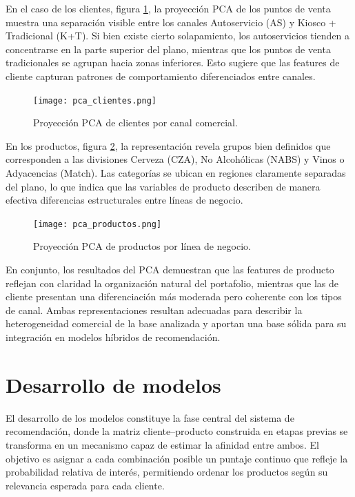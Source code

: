 En el caso de los clientes, figura \ref{fig:pca_clientes}, la proyección PCA de los puntos de venta muestra una separación visible entre los canales Autoservicio (AS) y Kiosco + Tradicional (K+T). Si bien existe cierto solapamiento, los autoservicios tienden a concentrarse en la parte superior del plano, mientras que los puntos de venta tradicionales se agrupan hacia zonas inferiores. Esto sugiere que las features de cliente capturan patrones de comportamiento diferenciados entre canales.

\begin{figure}[h]
	\centering
	\texttt{[image: pca\_clientes.png]}
	\caption[Proyección PCA de clientes por canal comercial]{Proyección PCA de clientes por canal comercial.}
	\label{fig:pca_clientes}
\end{figure}

En los productos, figura \ref{fig:pca_productos}, la representación revela grupos bien definidos que corresponden a las divisiones Cerveza (CZA), No Alcohólicas (NABS) y Vinos o Adyacencias (Match). Las categorías se ubican en regiones claramente separadas del plano, lo que indica que las variables de producto describen de manera efectiva diferencias estructurales entre líneas de negocio.

\begin{figure}[h]
	\centering
	\texttt{[image: pca\_productos.png]}
	\caption[Proyección PCA de productos por línea de negocio]{Proyección PCA de productos por línea de negocio.}
	\label{fig:pca_productos}
\end{figure}

En conjunto, los resultados del PCA demuestran que las features de producto reflejan con claridad la organización natural del portafolio, mientras que las de cliente presentan una diferenciación más moderada pero coherente con los tipos de canal. Ambas representaciones resultan adecuadas para describir la heterogeneidad comercial de la base analizada y aportan una base sólida para su integración en modelos híbridos de recomendación.


\section{Desarrollo de modelos}

El desarrollo de los modelos constituye la fase central del sistema de recomendación, donde la matriz cliente–producto construida en etapas previas se transforma en un mecanismo capaz de estimar la afinidad entre ambos. El objetivo es asignar a cada combinación posible un puntaje continuo que refleje la probabilidad relativa de interés, permitiendo ordenar los productos según su relevancia esperada para cada cliente.

